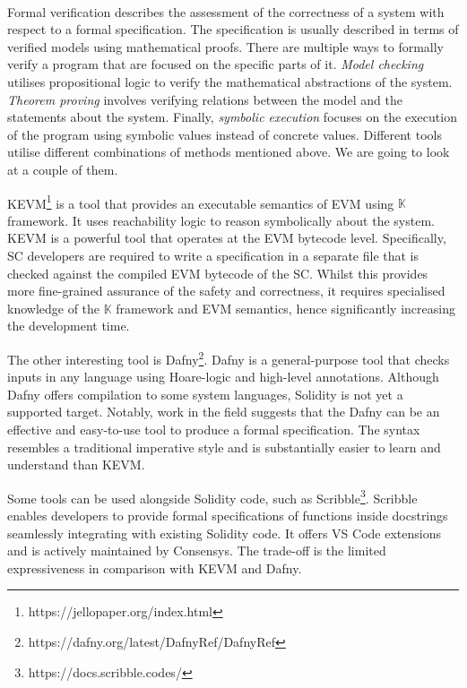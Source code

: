 \documentclass[oneside]{ecsproject}     %
\begin{document}
\paragraph*{}
Formal verification describes the assessment of the correctness of a system with respect
to a formal specification\cite{eth_formal_verification}. The specification is usually described
in terms of verified models using mathematical proofs. There are multiple ways to formally verify a program
that are focused on the specific parts of it. \textit{Model checking} utilises propositional logic 
to verify the mathematical abstractions of the system. \textit{Theorem proving} involves verifying
relations between the model and the statements about the system. Finally, \textit{symbolic execution} focuses
on the execution of the program using symbolic values instead of concrete values\cite{eth_formal_verification}.
Different tools utilise different combinations of methods mentioned above. We are going to look at a couple of them.

KEVM\footnote{https://jellopaper.org/index.html} is a tool that provides an executable semantics of EVM using $\mathbb{K}$ framework. 
It uses reachability logic to reason symbolically about the system\cite{kevm}. KEVM is a powerful tool that operates at the EVM bytecode level.
Specifically, SC developers are required to write a specification in a separate file that is checked against the compiled EVM bytecode of the SC.
Whilst this provides more fine-grained assurance of the safety and correctness, it requires specialised knowledge of the $\mathbb{K}$ framework and EVM
semantics, hence significantly increasing the development time.

The other interesting tool is Dafny\footnote{https://dafny.org/latest/DafnyRef/DafnyRef}. Dafny is a general-purpose tool that checks inputs in any language 
using Hoare-logic and high-level annotations. Although Dafny offers compilation to some system languages, Solidity is not yet a supported target. 
Notably, work in the field suggests that the Dafny can be an effective and easy-to-use tool to produce a formal specification\cite{dafny_deductive}.
The syntax resembles a traditional imperative style and is substantially easier to learn and understand than KEVM.

Some tools can be used alongside Solidity code, such as Scribble\footnote{https://docs.scribble.codes/}. 
Scribble enables developers to provide formal specifications of functions inside docstrings seamlessly integrating with existing Solidity code. 
It offers VS Code extensions and is actively maintained by Consensys. 
The trade-off is the limited expressiveness in comparison with KEVM and Dafny.
\end{document}
